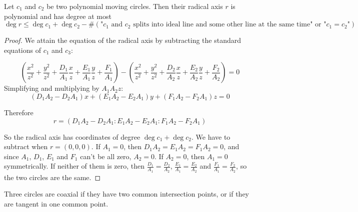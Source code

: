\documentclass[a4paper]{article}
\begin{document}
\begin{theorem}
    Let $c_1$ and $c_2$ be two polynomial moving circles. Then their radical axis $r$ is polynomial and has degree at most
    $$\deg r\le \deg c_1+\deg c_2-\#(\text{"$c_1$ and $c_2$ splits into ideal line and some other line at the same time" or "$c_1=c_2$"})$$
\end{theorem}
\begin{proof}
    We attain the equation of the radical axis by subtracting the standard equations of $c_1$ and $c_3$:

    $$\left(\frac{x^2}{z^2}+\frac{y^2}{z^2}+\frac{D_1}{A_1}\frac{x}{z}+\frac{E_1}{A_1}\frac{y}{z}+\frac{F_1}{A_1}\right)-\left(\frac{x^2}{z^2}+\frac{y^2}{z^2}+\frac{D_2}{A_2}\frac{x}{z}+\frac{E_2}{A_2}\frac{y}{z}+\frac{F_2}{A_2}\right)=0$$
    Simplifying and multiplying by $A_1A_2z$:
    $$(D_1A_2-D_2A_1)x+(E_1A_2-E_2A_1)y+(F_1A_2-F_2A_1)z=0$$

    Therefore
    $$r=(D_1A_2-D_2A_1:E_1A_2-E_2A_1:F_1A_2-F_2A_1)$$

    So the radical axis has coordinates of degree $\deg c_1+\deg c_2$. We have to subtract when $r=(0,0,0)$. If $A_1=0$, then $D_1A_2=E_1A_2=F_1A_2=0$, and since $A_1$, $D_1$, $E_1$ and $F_1$ can't be all zero, $A_2=0$. If $A_2=0$, then $A_1=0$ symmetrically. If neither of them is zero, then $\frac{D_1}{A_1}=\frac{D_2}{A_2}$, $\frac{E_1}{A_1}=\frac{E_2}{A_2}$ and $\frac{F_1}{A_1}=\frac{F_2}{A_2}$, so the two circles are the same.
\end{proof}


Three circles are coaxial if they have two common intersection points, or if they are tangent in one common point.
\end{document}
